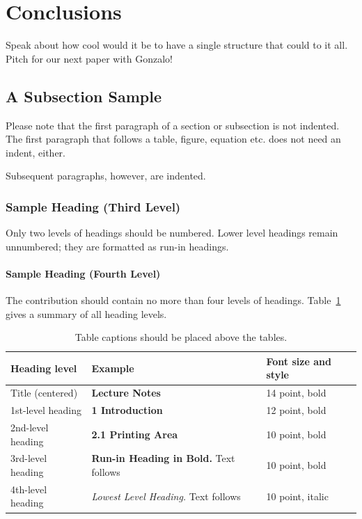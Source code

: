\documentclass[runningheads]{llncs}
\begin{document}
\section{Conclusions}
Speak about how cool would it be to have a single structure that could to it all. Pitch for our next paper with Gonzalo!

\subsection{A Subsection Sample}
Please note that the first paragraph of a section or subsection is
not indented. The first paragraph that follows a table, figure,
equation etc. does not need an indent, either.

Subsequent paragraphs, however, are indented.

\subsubsection{Sample Heading (Third Level)} Only two levels of
headings should be numbered. Lower level headings remain unnumbered;
they are formatted as run-in headings.

\paragraph{Sample Heading (Fourth Level)}
The contribution should contain no more than four levels of
headings. Table~\ref{tab1} gives a summary of all heading levels.

\begin{table}
\caption{Table captions should be placed above the
tables.}\label{tab1}
\begin{tabular}{|l|l|l|}
\hline
Heading level &  Example & Font size and style\\
\hline
Title (centered) &  {\Large\bfseries Lecture Notes} & 14 point, bold\\
1st-level heading &  {\large\bfseries 1 Introduction} & 12 point, bold\\
2nd-level heading & {\bfseries 2.1 Printing Area} & 10 point, bold\\
3rd-level heading & {\bfseries Run-in Heading in Bold.} Text follows & 10 point, bold\\
4th-level heading & {\itshape Lowest Level Heading.} Text follows & 10 point, italic\\
\hline
\end{tabular}
\end{table}
\end{document}
